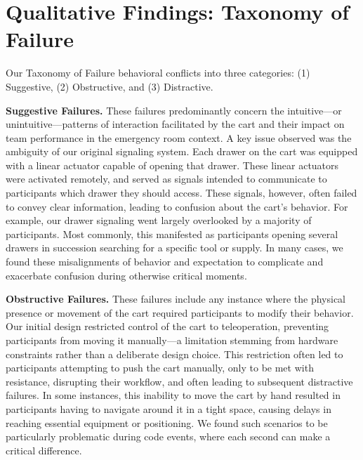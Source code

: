 \section{Qualitative Findings: Taxonomy of Failure}
\label{sec:qual_results}

Our Taxonomy of Failure behavioral conflicts into three categories: (1) Suggestive, (2) Obstructive, and (3) Distractive.

\textbf{Suggestive Failures.} These failures predominantly concern the intuitive—or unintuitive—patterns of interaction facilitated by the cart and their impact on team performance in the emergency room context. 
A key issue observed was the ambiguity of our original signaling system. 
Each drawer on the cart was equipped with a linear actuator capable of opening that drawer. 
These linear actuators were activated remotely, and served as signals intended to communicate to participants which drawer they should access. 
These signals, however, often failed to convey clear information, leading to confusion about the cart’s behavior. 
For example, our drawer signaling went largely overlooked by a majority of participants. 
Most commonly, this manifested as participants opening several drawers in succession searching for a specific tool or supply. 
In many cases, we found these misalignments of behavior and expectation to complicate and exacerbate confusion during otherwise critical moments.

\textbf{Obstructive Failures.} These failures include any instance where the physical presence or movement of the cart required participants to modify their behavior. 
Our initial design restricted control of the cart to teleoperation, preventing participants from moving it manually—a limitation stemming from hardware constraints rather than a deliberate design choice. 
This restriction often led to participants attempting to push the cart manually, only to be met with resistance, disrupting their workflow, and often leading to subsequent distractive failures. 
In some instances, this inability to move the cart by hand resulted in participants having to navigate around it in a tight space, causing delays in reaching essential equipment or positioning. 
We found such scenarios to be particularly problematic during code events, where each second can make a critical difference.

